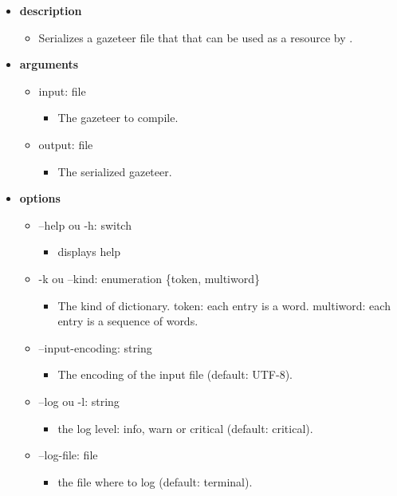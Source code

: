 \documentclass[manual-fr.tex]{subfiles}
\begin{document}
\begin{itemize}
    \item[] \textbf{description}
        \begin{itemize}
            \item[] Serializes a gazeteer file that that can be used as a resource by \SEM.
        \end{itemize}
    \item[] \textbf{arguments}
        \begin{itemize}
            \item[] input: file
                \begin{itemize}
                    \item[] The gazeteer to compile.
                \end{itemize}
            \item[] output: file
                \begin{itemize}
                    \item[] The serialized gazeteer.
                \end{itemize}
        \end{itemize}
    \item[] \textbf{options}
        \begin{itemize}
            \item[] --help ou -h: switch
                \begin{itemize}
                    \item[] displays help
                \end{itemize}
            \item[] -k ou --kind: enumeration \{token, multiword\}
                \begin{itemize}
                    \item[] The kind of dictionary. token: each entry is a word. multiword: each entry is a sequence of words.
                \end{itemize}
            \item[] --input-encoding: string
                \begin{itemize}
                    \item[] The encoding of the input file (default: UTF-8).
                \end{itemize}
            \item[] --log ou -l: string
                \begin{itemize}
                    \item[] the log level: info, warn or critical (default: critical).
                \end{itemize}
            \item[] --log-file: file
                \begin{itemize}
                    \item[] the file where to log (default: terminal).
                \end{itemize}
        \end{itemize}
\end{itemize}
\end{document}
